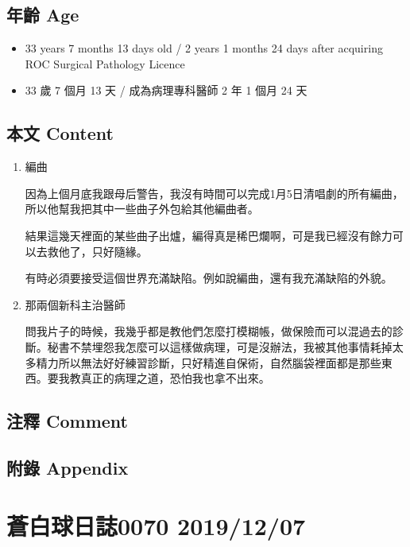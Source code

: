 \documentclass[
]{article}
\providecommand{\tightlist}{%
  \setlength{\itemsep}{0pt}\setlength{\parskip}{0pt}}
\begin{document}
\hypertarget{ux5e74ux9f61-age-5}{%
\subsection{年齡 Age}\label{ux5e74ux9f61-age-5}}

\begin{itemize}
\tightlist
\item
  33 years 7 months 13 days old / 2 years 1 months 24 days after
  acquiring ROC Surgical Pathology Licence
\item
  33 歲 7 個月 13 天 / 成為病理專科醫師 2 年 1 個月 24 天
\end{itemize}

\hypertarget{ux672cux6587-content-5}{%
\subsection{本文 Content}\label{ux672cux6587-content-5}}

\begin{enumerate}
\def\labelenumi{\arabic{enumi}.}
\item
  編曲

  因為上個月底我跟母后警告，我沒有時間可以完成1月5日清唱劇的所有編曲，所以他幫我把其中一些曲子外包給其他編曲者。

  結果這幾天裡面的某些曲子出爐，編得真是稀巴爛啊，可是我已經沒有餘力可以去救他了，只好隨緣。

  有時必須要接受這個世界充滿缺陷。例如說編曲，還有我充滿缺陷的外貌。
\item
  那兩個新科主治醫師

  問我片子的時候，我幾乎都是教他們怎麼打模糊帳，做保險而可以混過去的診斷。秘書不禁埋怨我怎麼可以這樣做病理，可是沒辦法，我被其他事情耗掉太多精力所以無法好好練習診斷，只好精進自保術，自然腦袋裡面都是那些東西。要我教真正的病理之道，恐怕我也拿不出來。
\end{enumerate}

\hypertarget{ux6ce8ux91cb-comment-5}{%
\subsection{注釋 Comment}\label{ux6ce8ux91cb-comment-5}}

\hypertarget{ux9644ux9304-appendix-5}{%
\subsection{附錄 Appendix}\label{ux9644ux9304-appendix-5}}

\hypertarget{ux84bcux767dux7403ux65e5ux8a8c0070-20191207}{%
\section{蒼白球日誌0070
2019/12/07}\label{ux84bcux767dux7403ux65e5ux8a8c0070-20191207}}
\end{document}
